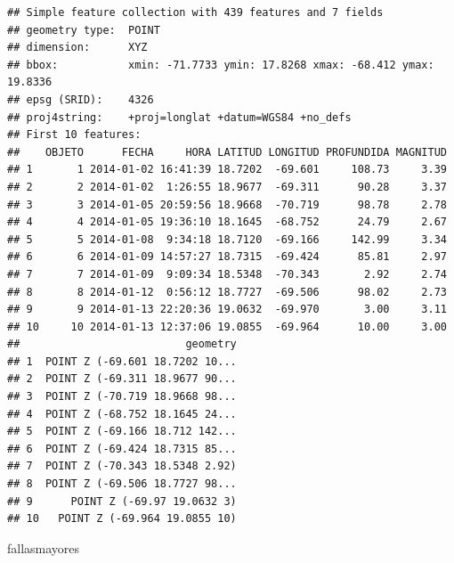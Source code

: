 \documentclass[11pt,]{article}
\newenvironment{Shaded}{\begin{snugshade}}{\end{snugshade}}
\newcommand{\KeywordTok}[1]{\textcolor[rgb]{0.13,0.29,0.53}{\textbf{#1}}}
\newcommand{\DecValTok}[1]{\textcolor[rgb]{0.00,0.00,0.81}{#1}}
\newcommand{\StringTok}[1]{\textcolor[rgb]{0.31,0.60,0.02}{#1}}
\newcommand{\OperatorTok}[1]{\textcolor[rgb]{0.81,0.36,0.00}{\textbf{#1}}}
\newcommand{\NormalTok}[1]{#1}
\begin{document}
\begin{Shaded}
\end{Shaded}

\begin{verbatim}
## Simple feature collection with 439 features and 7 fields
## geometry type:  POINT
## dimension:      XYZ
## bbox:           xmin: -71.7733 ymin: 17.8268 xmax: -68.412 ymax: 19.8336
## epsg (SRID):    4326
## proj4string:    +proj=longlat +datum=WGS84 +no_defs
## First 10 features:
##    OBJETO      FECHA     HORA LATITUD LONGITUD PROFUNDIDA MAGNITUD
## 1       1 2014-01-02 16:41:39 18.7202  -69.601     108.73     3.39
## 2       2 2014-01-02  1:26:55 18.9677  -69.311      90.28     3.37
## 3       3 2014-01-05 20:59:56 18.9668  -70.719      98.78     2.78
## 4       4 2014-01-05 19:36:10 18.1645  -68.752      24.79     2.67
## 5       5 2014-01-08  9:34:18 18.7120  -69.166     142.99     3.34
## 6       6 2014-01-09 14:57:27 18.7315  -69.424      85.81     2.97
## 7       7 2014-01-09  9:09:34 18.5348  -70.343       2.92     2.74
## 8       8 2014-01-12  0:56:12 18.7727  -69.506      98.02     2.73
## 9       9 2014-01-13 22:20:36 19.0632  -69.970       3.00     3.11
## 10     10 2014-01-13 12:37:06 19.0855  -69.964      10.00     3.00
##                          geometry
## 1  POINT Z (-69.601 18.7202 10...
## 2  POINT Z (-69.311 18.9677 90...
## 3  POINT Z (-70.719 18.9668 98...
## 4  POINT Z (-68.752 18.1645 24...
## 5  POINT Z (-69.166 18.712 142...
## 6  POINT Z (-69.424 18.7315 85...
## 7  POINT Z (-70.343 18.5348 2.92)
## 8  POINT Z (-69.506 18.7727 98...
## 9      POINT Z (-69.97 19.0632 3)
## 10   POINT Z (-69.964 19.0855 10)
\end{verbatim}

\begin{Shaded}
\begin{Highlighting}[]
\NormalTok{fallasmayores}
\end{Highlighting}
\end{Shaded}
\end{document}
